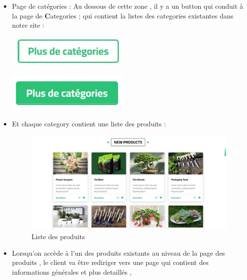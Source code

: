 \documentclass[a4paper,12pt,oneside]{article}
\begin{document}
{\begin{enumerate}
  	\begin{itemize}
  	\item Page de catégories : 
  	Au dessous de cette zone , il y a un button qui conduit à la page de \textbf Categories ; qui contient la
listes des categories existantes dans notre site :
\newpage
		\begin{minipage}{0.48\textwidth}
		\includegraphics[width=6cm]{plus-cat}
		\end{minipage}
		\begin{minipage}{0.48\textwidth}
		\includegraphics[width=6cm]{plus-cat-hover}
		\end{minipage}
		
		\vskip1cm
		\item Et chaque category contient une liste des produits :
  	
		\begin{figure}[h]
		\centering
  		\includegraphics[width=15cm]{prod}
  		\caption{Liste des produits}
		\end{figure}
		
		\vskip1cm
		\item Lorsqu’on accède à l’un des produits existants au niveau de la page des produits , le client va être
rediriger vers une page qui contient des informations générales et plus detaillés ,
  	

\end{itemize}
\end{enumerate}}
\end{document}
